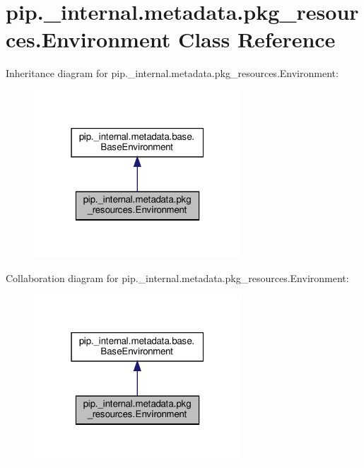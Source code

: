 \hypertarget{classpip_1_1__internal_1_1metadata_1_1pkg__resources_1_1Environment}{}\section{pip.\+\_\+internal.\+metadata.\+pkg\+\_\+resources.\+Environment Class Reference}
\label{classpip_1_1__internal_1_1metadata_1_1pkg__resources_1_1Environment}


Inheritance diagram for pip.\+\_\+internal.\+metadata.\+pkg\+\_\+resources.\+Environment\+:
\nopagebreak
\begin{figure}[H]
\begin{center}
\leavevmode
\includegraphics[width=220pt]{classpip_1_1__internal_1_1metadata_1_1pkg__resources_1_1Environment__inherit__graph}
\end{center}
\end{figure}


Collaboration diagram for pip.\+\_\+internal.\+metadata.\+pkg\+\_\+resources.\+Environment\+:
\nopagebreak
\begin{figure}[H]
\begin{center}
\leavevmode
\includegraphics[width=220pt]{classpip_1_1__internal_1_1metadata_1_1pkg__resources_1_1Environment__coll__graph}
\end{center}
\end{figure}
